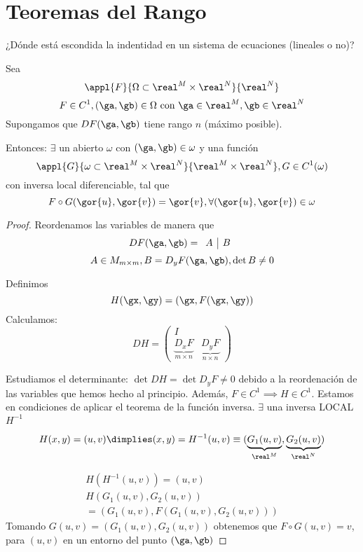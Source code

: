 \section{Teoremas del Rango}

¿Dónde está escondida la indentidad en un sistema de ecuaciones (lineales o no)?

\begin{theorem}
Sea \[\appl{F}{\Omega\subset \real^M\times\real^N}{\real^N}\]
\[F\in C^1, (\ga,\gb) \in \Omega \text{ con } \ga \in \real^M, \gb \in \real^N\]
Supongamos que $DF(\ga,\gb)$ tiene rango $n$ (máximo posible).

Entonces: $\exists$ un abierto $\omega$ con $(\ga,\gb) \in \omega$ y una función \[ \appl{G}{\omega\subset\real^M\times\real^N}{\real^M\times\real^N}, G\in C^1 (\omega)\] con inversa local diferenciable, tal que \[F\circ G(\gor{u},\gor{v}) = \gor{v}, \forall(\gor{u},\gor{v})\in \omega\]

\end{theorem}

\begin{proof}
 Reordenamos las variables de manera que \[DF(\ga,\gb) = \begin{array}{c|c} A &B \end{array}\]
 \[A \in M_{m\times m}, B = D_yF(\ga,\gb), \det B \neq 0\]
 
 Definimos \[H(\gx,\gy) = (\gx,F(\gx,\gy))\]
 Calculamos:
 \[DH = \left(\begin{array}{c|c}
         I & \\
         \underbrace{D_xF}_{m\times n} & \underbrace{D_yF}_{n\times n}
        \end{array}\right)\]
        
        
  Estudiamos el determinante: $\det DH = \det D_yF \neq 0$ debido a la reordenación de las variables que hemos hecho al principio. Además, $F\in C^1 \implies H \in C^1$. Estamos en condiciones de aplicar el teorema de la función inversa. $\exists$ una inversa LOCAL $H^{-1}$

  \[H(x,y) = (u,v) \dimplies (x,y) = H^{-1}(u,v) \equiv (\underbrace{G_1(u,v)}_{\real^M},\underbrace{G_2(u,v)}_{\real^N})\]
  
  \begin{gather*}
H(H^{-1}(u,v)) = (u,v)\\
H(G_1(u,v),G_2(u,v))\\
= (G_1(u,v),F(G_1(u,v),G_2(u,v)))
  \end{gather*}
 Tomando $G(u,v) = (G_1(u,v),G_2(u,v))$ obtenemos que $F\circ G(u,v) = v$, para $(u,v)$ en un entorno del punto $(\ga,\gb)$
 
\end{proof}


